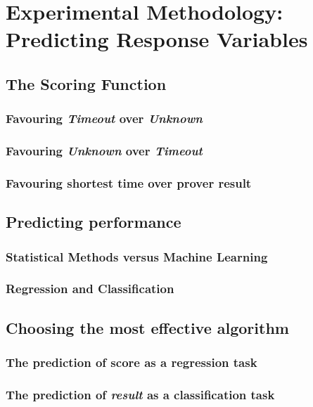 \chapter{Experimental Methodology: Predicting Response Variables}
\label{Prediction}

\section{The Scoring Function}
\subsection{Favouring \textit{Timeout} over \textit{Unknown}}
\subsection{Favouring \textit{Unknown} over \textit{Timeout}}
\subsection{Favouring shortest time over prover result}


\section{Predicting performance}
\subsection{Statistical Methods versus Machine Learning}
\subsection{Regression and Classification}
\section{Choosing the most effective algorithm}
\subsection{The prediction of score as a regression task}
\subsection{The prediction of \textit{result} as a classification task}
